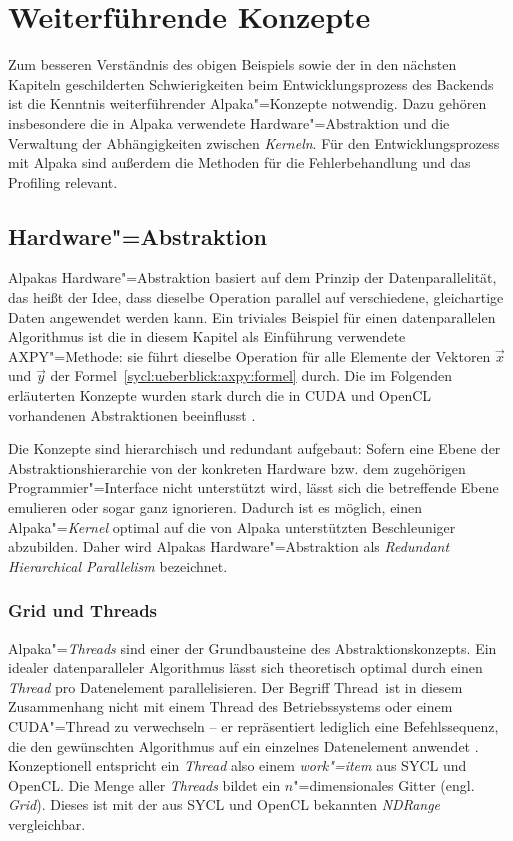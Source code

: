 \section{Weiterführende Konzepte}\label{alpaka:konzepte}

Zum besseren Verständnis des obigen Beispiels sowie der in den nächsten Kapiteln
geschilderten Schwierigkeiten beim Entwicklungsprozess des Backends ist die
Kenntnis weiterführender Alpaka"=Konzepte notwendig. Dazu gehören insbesondere
die in Alpaka verwendete Hardware"=Abstraktion und die Verwaltung der
Abhängigkeiten zwischen \textit{Kerneln}. Für den Entwicklungsprozess mit Alpaka
sind außerdem die Methoden für die Fehlerbehandlung und das Profiling relevant.

\subsection{Hardware"=Abstraktion}
\label{alpaka:konzepte:abstraktion}

Alpakas Hardware"=Abstraktion basiert auf dem Prinzip der Datenparallelität, das
heißt der Idee, dass dieselbe Operation parallel auf verschiedene, gleichartige
Daten angewendet werden kann. Ein triviales Beispiel für einen datenparallelen
Algorithmus ist die in diesem Kapitel als Einführung verwendete AXPY"=Methode:
sie führt dieselbe Operation für alle Elemente der Vektoren $\vec{x}$ und
$\vec{y}$ der Formel~\ref{sycl:ueberblick:axpy:formel} durch. Die im Folgenden
erläuterten Konzepte wurden stark durch die in CUDA und OpenCL vorhandenen
Abstraktionen beeinflusst \cite[vgl.][17]{worpitz2015}.

Die Konzepte sind hierarchisch und redundant aufgebaut: Sofern eine Ebene der
Abstraktionshierarchie von der konkreten Hardware bzw. dem zugehörigen
Programmier"=Interface nicht unterstützt wird, lässt sich die betreffende Ebene
emulieren oder sogar ganz ignorieren. Dadurch ist es möglich, einen
Alpaka"=\textit{Kernel} optimal auf die von Alpaka unterstützten Beschleuniger
abzubilden. Daher wird Alpakas Hardware"=Abstraktion als \textit{Redundant
Hierarchical Parallelism} bezeichnet. \cite[vgl.][22]{worpitz2015}

\subsubsection{Grid und Threads}

Alpaka"=\textit{Threads} sind einer der Grundbausteine des Abstraktionskonzepts.
Ein idealer datenparalleler Algorithmus lässt sich theoretisch optimal durch
einen \textit{Thread} pro Datenelement parallelisieren. Der Begriff
\glqq Thread\grqq\ ist in diesem Zusammenhang nicht mit einem Thread des
Betriebssystems oder einem CUDA"=Thread zu verwechseln -- er repräsentiert
lediglich eine Befehlssequenz, die den gewünschten Algorithmus auf ein einzelnes
Datenelement anwendet \cite[vgl.][17]{worpitz2015}. Konzeptionell entspricht
ein \textit{Thread} also einem \textit{work"=item} aus SYCL und OpenCL. Die
Menge aller \textit{Threads} bildet ein $n$"=dimensionales Gitter
(engl. \textit{Grid}). Dieses ist mit der aus SYCL und OpenCL bekannten
\textit{NDRange} vergleichbar.

